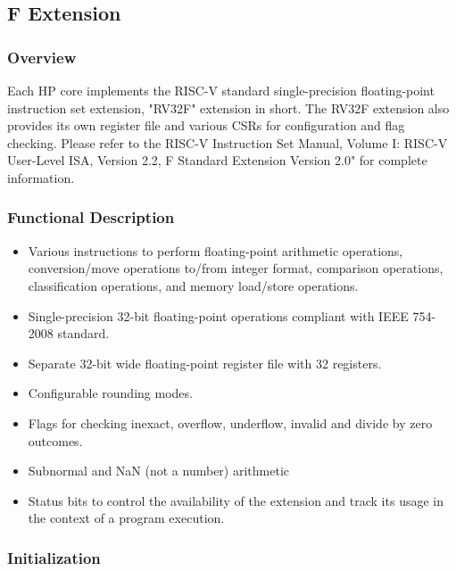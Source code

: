 \documentclass[main\_\_EN.tex]{subfiles}
\begin{document}
\newpage

\subsection{F Extension}
\label{sec:riscvcpu-fpu}

\subsubsection{Overview}
\label{sec:riscvcpu-fpu-overview}

Each HP core implements the RISC-V standard single-precision floating-point instruction set extension, "RV32F" extension in short. The RV32F extension also provides its own register file and various CSRs for configuration and flag checking. Please refer to the RISC-V Instruction Set Manual, Volume I: RISC-V User-Level ISA, Version 2.2, F Standard Extension Version 2.0" for complete information.

\subsubsection{Functional Description}
\label{sec:riscvcpu-fpu-func-descr}

\begin{itemize}
    \item Various instructions to perform floating-point arithmetic operations, conversion/move operations to/from integer format, comparison operations, classification operations, and memory load/store operations.
    \item Single-precision 32-bit floating-point operations compliant with IEEE 754-2008 standard.
    \item Separate 32-bit wide floating-point register file with 32 registers.
    \item Configurable rounding modes.
    \item Flags for checking inexact, overflow, underflow, invalid and divide by zero outcomes.
    \item Subnormal and NaN (not a number) arithmetic
    \item Status bits to control the availability of the extension and track its usage in the context of a program execution.
\end{itemize}

\subsubsection{Initialization}
\label{sec:riscvcpu-fpu-init}
\end{document}
